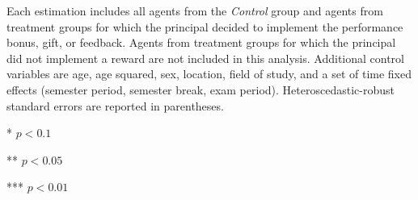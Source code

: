 \begin{table}[h]
\begin{center}
{\begin{minipage}{\textwidth}
Each estimation includes all agents from the \textit{Control} group and agents from treatment groups for which the principal decided to implement the performance bonus, gift, or feedback. Agents from treatment groups for which the principal did not implement a reward are not included in this analysis. 
Additional control variables are age, age squared, sex, location, field of study, and a set of time fixed effects (semester period, semester break, exam period). 
Heteroscedastic-robust standard errors are reported in parentheses. 

*   $ p < 0.1  $

**  $ p < 0.05 $

*** $ p < 0.01 $
\end{minipage}}
\end{center}
\label{tab:Feedback}
\end{table}